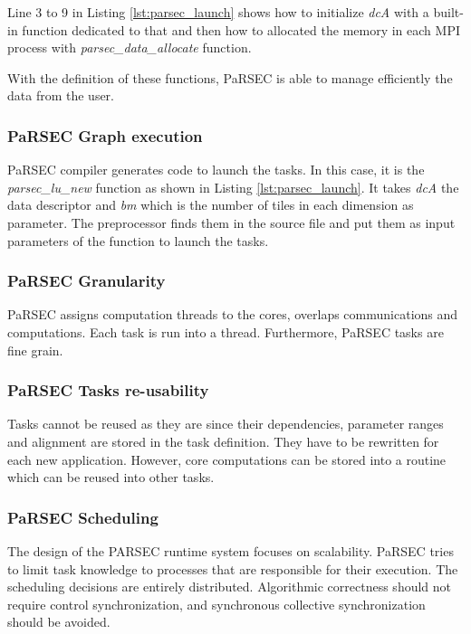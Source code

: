 Line 3 to 9 in Listing \ref{lst:parsec_launch} shows how to initialize \textit{dcA} with a built-in function dedicated to that and then how to allocated the memory in each MPI process with \textit{parsec\_data\_allocate} function.

With the definition of these functions, PaRSEC is able to manage efficiently the data from the user.


\subsubsection{PaRSEC Graph execution}
PaRSEC compiler generates code to launch the tasks.
In this case, it is the \textit{parsec\_lu\_new} function as shown in Listing \ref{lst:parsec_launch}.
It takes \textit{dcA} the data descriptor and \textit{bm} which is the number of tiles in each dimension as parameter.
The preprocessor finds them in the source file and put them as input parameters of the function to launch the tasks.




\subsubsection{PaRSEC Granularity}
PaRSEC assigns computation threads to the cores, overlaps communications and computations.
Each task is run into a thread.
Furthermore, PaRSEC tasks are fine grain.

\subsubsection{PaRSEC Tasks re-usability}
Tasks cannot be reused as they are since their dependencies, parameter ranges and alignment are stored in the task definition.
They have to be rewritten for each new application.
However, core computations can be stored into a routine which can be reused into other tasks.

\subsubsection{PaRSEC Scheduling}
The design of the PARSEC runtime system focuses on scalability.
PaRSEC tries to limit task knowledge to processes that are responsible for their execution.
The scheduling decisions are entirely distributed.
Algorithmic correctness should not require control synchronization, and synchronous collective synchronization should be avoided.


